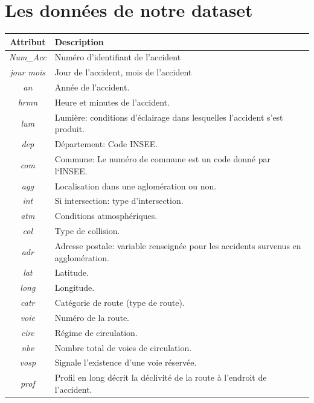 \documentclass{article}
\begin{document}
    \section{Les données de notre dataset}
    \label{appendix:dataset}
    \begin{center}
        \begin{tabular}{ |c|p{9cm}| }
            \hline
            \textbf{Attribut} & \textbf{Description} \\
            \hline
            \textit{Num\_Acc} & Numéro d'identifiant de l'accident \\
            \textit{jour mois} & Jour de l'accident, mois de l'accident \\
            \textit{an} & Année de l'accident. \\
            \textit{hrmn} & Heure et minutes de l'accident. \\
            \textit{lum} & Lumière: conditions d'éclairage dans lesquelles l'accident s'est produit. \\
            \textit{dep} & Département: Code INSEE.\\
            \textit{com} & Commune: Le numéro de commune est un code donné par l‘INSEE. \\
            \textit{agg} & Localisation dans une aglomération ou non. \\
            \textit{int} & Si intersection: type d'intersection. \\
            \textit{atm} & Conditions atmosphériques. \\
            \textit{col} & Type de collision. \\
            \textit{adr} & Adresse postale: variable renseignée pour les accidents survenus en agglomération. \\
            \textit{lat} & Latitude. \\
            \textit{long} & Longitude. \\
            \textit{catr} & Catégorie de route (type de route). \\  
            \textit{voie} & Numéro de la route. \\  
            \textit{circ} & Régime de circulation. \\  
            \textit{nbv} & Nombre total de voies de circulation. \\  
            \textit{vosp} & Signale l'existence d'une voie réservée. \\  
            \textit{prof} & Profil en long décrit la déclivité de la route à l'endroit de l'accident. \\  

\end{tabular}
\end{center}
\end{document}
